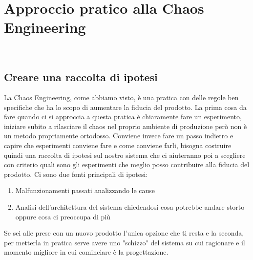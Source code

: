 
\chapter{Approccio pratico alla Chaos Engineering}
\label{cap:descrizione-stage}

\\

\section{Creare una raccolta di ipotesi}
La Chaos Engineering, come abbiamo visto, è una pratica con delle regole ben specifiche che ha lo scopo di aumentare la fiducia del prodotto.
La prima cosa da fare quando ci si approccia a questa pratica è chiaramente fare un esperimento, iniziare subito a rilasciare il chaos nel proprio ambiente di produzione però non è un metodo propriamente ortodosso.
Conviene invece fare un passo indietro e capire che esperimenti conviene fare e come conviene farli, bisogna costruire quindi una raccolta di ipotesi sul nostro sistema che ci aiuteranno poi a scegliere con criterio quali sono gli esperimenti che meglio posso contribuire alla fiducia del prodotto.
Ci sono due fonti principali di ipotesi:
\begin{enumerate}
    \item Malfunzionamenti passati analizzando le cause
    \item Analisi dell'architettura del sistema chiedendosi cosa potrebbe andare storto oppure cosa ci preoccupa di più
\end{enumerate}
Se sei alle prese con un nuovo prodotto l'unica opzione che ti resta e la seconda, per metterla in pratica serve avere uno "schizzo" del sistema su cui ragionare e il momento migliore in cui cominciare è la progettazione.

